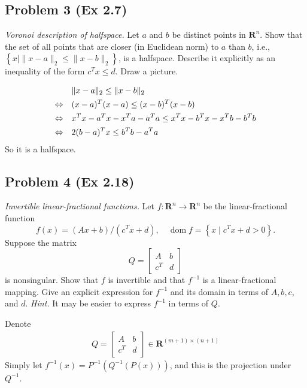 \documentclass[en,hazy,black,12pt,device = normal]{elegantnote}
\begin{document}
\subsection*{Problem 3 (Ex 2.7)}
\textit{Voronoi description of halfspace.} Let $a$ and $b$ be distinct points in $\mathbf{R}^n$. Show that the set of all points that are closer (in Euclidean norm) to $a$ than $b$, i.e., $\left\{x \mid\|x-a\|_2 \leq\|x-b\|_2\right\}$, is a halfspace. Describe it explicitly as an inequality of the form $c^T x \leq d$. Draw a picture.

\begin{tcolorbox}
    \sol
    \begin{align*}
        &\Vert x-a \Vert_2 \leq \Vert x-b \Vert_2 \\
        \Leftrightarrow\quad& (x-a)^T(x-a) \leq (x-b)^T(x-b) \\
        \Leftrightarrow\quad& x^Tx -a^Tx -x^Ta -a^Ta \leq x^Tx -b^Tx -x^Tb -b^Tb \\
        \Leftrightarrow\quad& 2(b-a)^T x \leq b^Tb-a^Ta
    \end{align*}
    So it is a halfspace.
\end{tcolorbox}

\subsection*{Problem 4 (Ex 2.18)}
\textit{Invertible linear-fractional functions.} Let $f: \mathbf{R}^n \rightarrow \mathbf{R}^n$ be the linear-fractional function
$$
f(x)=(A x+b) /\left(c^T x+d\right), \quad \operatorname{dom} f=\left\{x \mid c^T x+d>0\right\} .
$$
Suppose the matrix
$$
Q=\left[\begin{array}{cc}
A & b \\
c^T & d
\end{array}\right]
$$
is nonsingular. Show that $f$ is invertible and that $f^{-1}$ is a linear-fractional mapping. Give an explicit expression for $f^{-1}$ and its domain in terms of $A, b, c$, and $d$. \textit{Hint.} It may be easier to express $f^{-1}$ in terms of $Q$.

\begin{tcolorbox}
    \sol

    Denote
    \begin{align*}
        Q=\left[\begin{array}{cc}
            A & b \\
            c^T & d
            \end{array}\right] \in \mathbf{R}^{(m+1) \times(n+1)}
    \end{align*}
    Simply let \(f^{-1} (x) = P^{-1}\left(Q^{-1}\left(P(x)\right)\right)\), and this is the projection under \(Q^{-1}\).
\end{tcolorbox}
\end{document}
